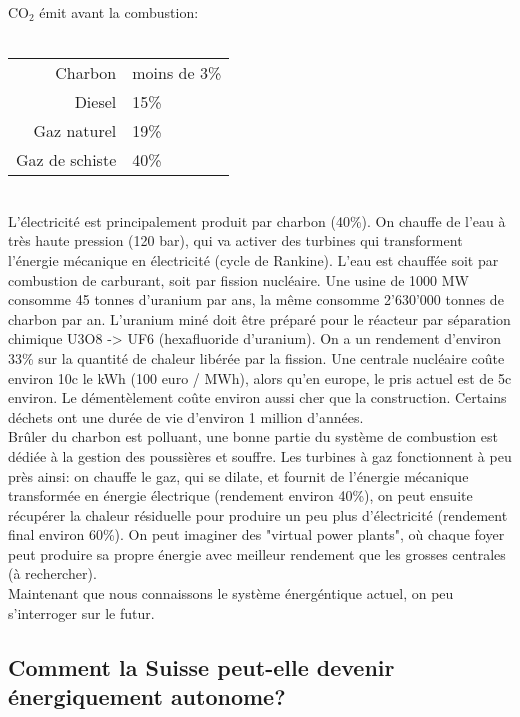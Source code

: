 \documentclass{article}
\begin{document}
 CO$_2$ émit avant la combustion: \\ \\
\begin{tabular}{ r | l }
	Charbon & moins de 3\% \\
	Diesel  & 15\% \\
	Gaz naturel & 19\% \\
	Gaz de schiste & 40\% \\
\end{tabular} \\

L'électricité est principalement produit par charbon (40\%). On chauffe de l'eau à très haute pression (120 bar), qui va activer des turbines qui transforment l'énergie mécanique en électricité (cycle de Rankine). L'eau est chauffée soit par combustion de carburant, soit par fission nucléaire. Une usine de 1000 MW consomme 45 tonnes d'uranium par ans, la même consomme 2'630'000 tonnes de charbon par an. L'uranium miné doit être préparé pour le réacteur par séparation chimique U3O8 -> UF6 (hexafluoride d'uranium).  On a un rendement d'environ 33\% sur la quantité de chaleur libérée par la fission. Une centrale nucléaire coûte environ 10c le kWh (100 euro / MWh), alors qu'en europe, le pris actuel est de 5c environ. Le démentèlement coûte environ aussi cher que la construction. Certains déchets ont une durée de vie d'environ 1 million d'années. \\

 Brûler du charbon est polluant, une bonne partie du système de combustion est dédiée à la gestion des poussières et souffre. Les turbines à gaz fonctionnent à peu près ainsi: on chauffe le gaz, qui se dilate, et fournit de l'énergie mécanique transformée en énergie électrique (rendement environ 40\%), on peut ensuite récupérer la chaleur résiduelle pour produire un peu plus d'électricité (rendement final environ 60\%). On peut imaginer des "virtual power plants", où chaque foyer peut produire sa propre énergie avec meilleur rendement que les grosses centrales (à rechercher). \\

Maintenant que nous connaissons le système énergéntique actuel, on peu s'interroger sur le futur.

\subsection{Comment la Suisse peut-elle devenir énergiquement autonome?}
\end{document}
